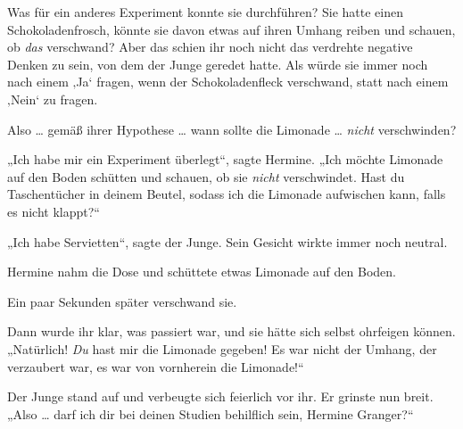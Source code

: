 Was für ein anderes Experiment konnte sie durchführen? Sie hatte einen Schokoladenfrosch, könnte sie davon etwas auf ihren Umhang reiben und schauen, ob \emph{das} verschwand? Aber das schien ihr noch nicht das verdrehte negative Denken zu sein, von dem der Junge geredet hatte. Als würde sie immer noch nach einem ‚Ja‘ fragen, wenn der Schokoladenfleck verschwand, statt nach einem ‚Nein‘ zu fragen.

Also … gemäß ihrer Hypothese … wann sollte die Limonade … \emph{nicht} verschwinden?

„Ich habe mir ein Experiment überlegt“, sagte Hermine.
„Ich möchte Limonade auf den Boden schütten und schauen, ob sie \emph{nicht} verschwindet. Hast du Taschentücher in deinem Beutel, sodass ich die Limonade aufwischen kann, falls es nicht klappt?“

„Ich habe Servietten“, sagte der Junge. Sein Gesicht wirkte immer noch neutral.

Hermine nahm die Dose und schüttete etwas Limonade auf den Boden.

Ein paar Sekunden später verschwand sie.

Dann wurde ihr klar, was passiert war, und sie hätte sich selbst ohrfeigen können.
„Natürlich! \emph{Du} hast mir die Limonade gegeben! Es war nicht der Umhang, der verzaubert war, es war von vornherein die Limonade!“

Der Junge stand auf und verbeugte sich feierlich vor ihr. Er grinste nun breit.
„Also … darf ich dir bei deinen Studien behilflich sein, Hermine Granger?“

